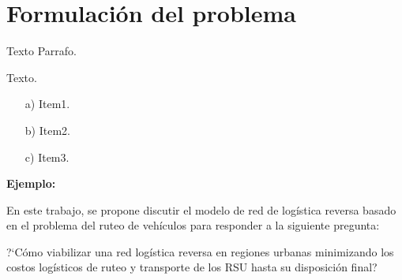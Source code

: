 \section{Formulación del problema}
Texto Parrafo.\par    
\vskip 0.3cm
Texto.
\begin{enumerate}
  \item[a)] Item1.
  \item[b)] Item2.
  \item[c)] Item3.
  \end{enumerate}
\vskip 0.3cm

{\bf Ejemplo:}\par

  En este trabajo, se propone discutir el modelo de red  de logística reversa basado en el problema del ruteo de vehículos para responder a la siguiente pregunta:
 \begin{center} 
     ?`Cómo viabilizar una red logística reversa en regiones urbanas minimizando los costos logísticos de ruteo y transporte de los RSU hasta su disposición final?
 \end{center}